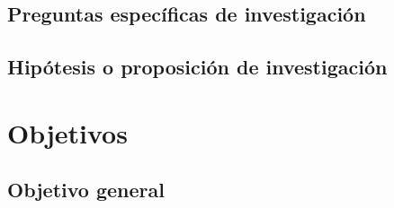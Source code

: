 \documentclass[12pt,a4paper]{report}
\begin{document}
\section{Preguntas específicas de investigación}

%
%
%
%
%
%
%


\section{Hipótesis o proposición de investigación}

%
%
%
%



\chapter{Objetivos}


\section{Objetivo general}
\end{document}
